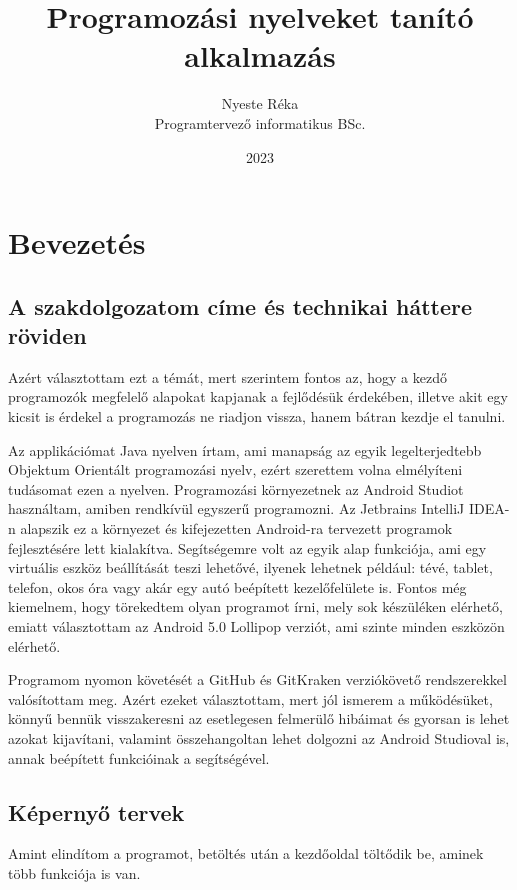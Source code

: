 \documentclass{thesis-ekf}
\begin{document}
	\title{Programozási nyelveket tanító alkalmazás}
	\author{Nyeste Réka\\Programtervező informatikus BSc.}
	\date{2023}
	\maketitle
	\tableofcontents
	\chapter{Bevezetés}
	\section{A szakdolgozatom címe és technikai háttere röviden}
	Azért választottam ezt a témát, mert szerintem fontos az, hogy a kezdő programozók megfelelő alapokat kapjanak a fejlődésük érdekében, illetve akit egy kicsit is érdekel a programozás ne riadjon vissza, hanem bátran kezdje el tanulni.
	
	Az applikációmat Java nyelven írtam, ami manapság az egyik legelterjedtebb Objektum Orientált programozási nyelv, ezért szerettem volna elmélyíteni tudásomat ezen a nyelven. Programozási környezetnek az Android Studiot használtam, amiben rendkívül egyszerű programozni. Az Jetbrains IntelliJ IDEA-n alapszik ez a környezet és kifejezetten Android-ra tervezett programok fejlesztésére lett kialakítva. Segítségemre volt az egyik alap funkciója, ami egy virtuális eszköz beállítását teszi lehetővé, ilyenek lehetnek például: tévé, tablet, telefon, okos óra vagy akár egy autó beépített kezelőfelülete is. Fontos még kiemelnem, hogy törekedtem olyan programot írni, mely sok készüléken elérhető, emiatt választottam az Android 5.0 Lollipop verziót, ami szinte minden eszközön elérhető.
	
	Programom nyomon követését a GitHub és GitKraken verziókövető rendszerekkel valósítottam meg. Azért ezeket választottam, mert jól ismerem a működésüket, könnyű bennük visszakeresni az esetlegesen felmerülő hibáimat és gyorsan is lehet azokat kijavítani, valamint összehangoltan lehet dolgozni az Android Studioval is, annak beépített funkcióinak a segítségével. 
	
	\newpage
	\section{Képernyő tervek}
	Amint elindítom a programot, betöltés után a kezdőoldal töltődik be, aminek több funkciója is van.
	
\end{document}
